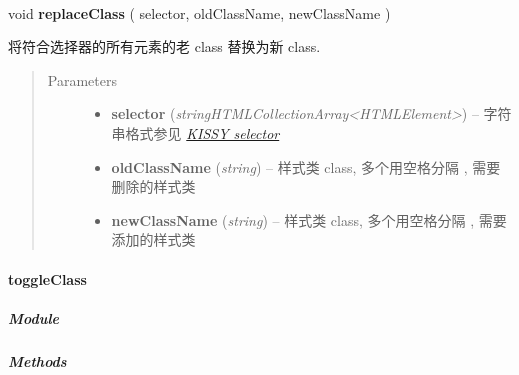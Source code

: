 \documentclass[letterpaper,10pt,english]{sphinxmanual}
\begin{document}
\begin{fulllineitems}
\label{api/core/dom/replaceClass:DOM.replaceClass}~
\begin{DUlineblock}{0em}
\item[] void \textbf{replaceClass} ( selector, oldClassName, newClassName )
\item[] 将符合选择器的所有元素的老 class 替换为新 class.
\end{DUlineblock}
\begin{quote}\begin{description}
\item[{Parameters}] \leavevmode\begin{itemize}
\item {}
\textbf{selector} (\emph{string\textbar{}HTMLCollection\textbar{}Array\textless{}HTMLElement\textgreater{}}) -- 字符串格式参见 {\hyperref[api/core/dom/selector:dom-selector]{\emph{KISSY selector}}}

\item {}
\textbf{oldClassName} (\emph{string}) -- 样式类 class, 多个用空格分隔 , 需要删除的样式类

\item {}
\textbf{newClassName} (\emph{string}) -- 样式类 class, 多个用空格分隔 , 需要添加的样式类

\end{itemize}

\end{description}\end{quote}

\end{fulllineitems}



\paragraph{toggleClass}
\label{api/core/dom/toggleClass::doc}\label{api/core/dom/toggleClass:toggleclass}

\subparagraph{Module}
\label{api/core/dom/toggleClass:module}\begin{quote}

{\hyperref[api/core/dom/index:module-DOM]{}}
\end{quote}


\subparagraph{Methods}
\label{api/core/dom/toggleClass:methods}
\end{document}
